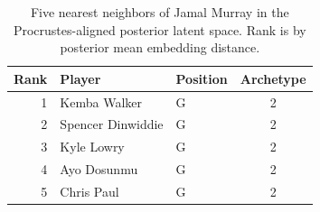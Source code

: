 \begin{table}[htbp]
  \centering\small
  \begin{tabular}{rllc}
    \toprule
    Rank & Player & Position & Archetype \\
    \midrule
    1 & Kemba Walker & G & 2 \\
    2 & Spencer Dinwiddie & G & 2 \\
    3 & Kyle Lowry & G & 2 \\
    4 & Ayo Dosunmu & G & 2 \\
    5 & Chris Paul & G & 2 \\
    \bottomrule
  \end{tabular}
  \caption{Five nearest neighbors of Jamal Murray in the Procrustes-aligned posterior latent space. Rank is by posterior mean embedding distance.}
  \label{tab:Jamal_Murray_neighbors}
\end{table}

